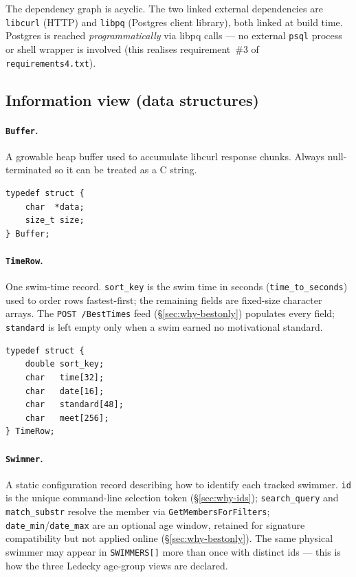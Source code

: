 \documentclass[12pt]{article}
\newcommand{\code}[1]{\texttt{#1}}
\begin{document}
The dependency graph is acyclic.  The two linked external
dependencies are \code{libcurl} (HTTP) and \code{libpq} (Postgres
client library), both linked at build time.  Postgres is reached
\emph{programmatically} via libpq calls --- no external
\texttt{psql} process or shell wrapper is involved (this
realises requirement~\#3 of \texttt{requirements4.txt}).

\subsection{Information view (data structures)}

\paragraph{\code{Buffer}.}
A growable heap buffer used to accumulate libcurl response chunks.
Always null-terminated so it can be treated as a C string.

\begin{lstlisting}
typedef struct {
    char  *data;
    size_t size;
} Buffer;
\end{lstlisting}

\paragraph{\code{TimeRow}.}
One swim-time record.  \code{sort\_key} is the swim time in seconds
(\code{time\_to\_seconds}) used to order rows fastest-first; the
remaining fields are fixed-size character arrays.  The
\code{POST /BestTimes} feed (\S\ref{sec:why-bestonly}) populates every
field; \code{standard} is left empty only when a swim earned no
motivational standard.

\begin{lstlisting}
typedef struct {
    double sort_key;
    char   time[32];
    char   date[16];
    char   standard[48];
    char   meet[256];
} TimeRow;
\end{lstlisting}

\paragraph{\code{Swimmer}.}
A static configuration record describing how to identify each
tracked swimmer.  \code{id} is the unique command-line selection
token (\S\ref{sec:why-ids}); \code{search\_query} and
\code{match\_substr} resolve the member via \code{GetMembersForFilters};
\code{date\_min}/\code{date\_max} are an optional age window, retained
for signature compatibility but not applied online
(\S\ref{sec:why-bestonly}).  The same physical swimmer may appear in
\code{SWIMMERS[]} more than once with distinct ids --- this is how the
three Ledecky age-group views are declared.
\end{document}
